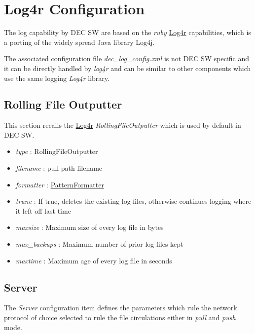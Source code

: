 \documentclass[dec_sum_main.tex]{subfiles}
\begin{document}
\section{Log4r Configuration}
 
The log capability by DEC SW are based on the \textit{ruby} \href{http://log4r.sourceforge.net/rdoc/files/log4r/configurator_rb.html}{Log4r} capabilities, which is a porting of the widely spread Java library Log4j. \newline
\par
\noindent
The associated configuration file \textit{dec\_log\_config.xml} is not DEC SW specific and it can be directly handled by \textit{log4r} and can be similar to other components which use the same logging \textit{Log4r} library.

\subsection{Rolling File Outputter}
This section recalls the \href{https://www.rubydoc.info/github/bestmike007/log4rails/Log4r/RollingFileOutputter}{Log4r} \textit{RollingFileOutputter} which is used by default in DEC SW.
\par
\noindent
\begin{itemize}
	\item \textit{type} : RollingFileOutputter
	\item \textit{filename} : pull path filename
	\item \textit{formatter} : \href{https://www.rubydoc.info/github/bestmike007/log4rails/Log4r/PatternFormatter}{PatternFormatter}
	\item \textit{trunc} : If true, deletes the existing log files, otherwise continues logging where it left off
	last time 
	\item \textit{maxsize} : Maximum size of every log file in bytes
	\item \textit{max\_backups} : Maximum number of prior log files kept
	\item \textit{maxtime} : Maximum age of every log file in seconds
\end{itemize}

\subsection{Server}
The \textit{Server} configuration item defines the parameters which rule the network protocol of choice selected to rule the file circulations either in \textit{pull} and \textit{push} mode.
\end{document}
